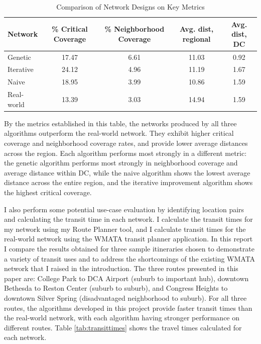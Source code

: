 \documentclass[sigconf,nonacm]{acmart}
\begin{document}
\begin{table}[h]
\caption{Comparison of Network Designs on Key Metrics}
\label{tab:networkmetrics}
\begin{tabular}{lcccc}
\toprule
\textbf{Network} & \textbf{\% Critical Coverage} & \textbf{\% Neighborhood Coverage} & \textbf{Avg. dist, regional} & \textbf{Avg. dist, DC} \\
\midrule
Genetic & 17.47 & 6.61 & 11.03 & 0.92 \\
Iterative & 24.12 & 4.96 & 11.19 & 1.67 \\
Naive & 18.95 & 3.99 & 10.86 & 1.59 \\
\midrule
Real-world & 13.39 & 3.03 & 14.94 & 1.59 \\
\bottomrule
\end{tabular}
\end{table}

By the metrics established in this table, the networks produced by all three algorithms outperform the real-world network. They exhibit higher critical coverage and neighborhood coverage rates, and provide lower average distances across the region. Each algorithm performs most strongly in a different metric: the genetic algorithm performs most strongly in neighborhood coverage and average distance within DC, while the naive algorithm shows the lowest average distance across the entire region, and the iterative improvement algorithm shows the highest critical coverage. 

I also perform some potential use-case evaluation by identifying location pairs and calculating the transit time in each network. I calculate the transit times for my network using my Route Planner tool, and I calculate transit times for the real-world network using the WMATA transit planner application. In this report I compare the results obtained for three sample itineraries chosen to demonstrate a variety of transit uses and to address the shortcomings of the existing WMATA network that I raised in the introduction. The three routes presented in this paper are: College Park to DCA Airport (suburb to important hub), downtown Bethesda to Reston Center (suburb to suburb), and Congress Heights to downtown Silver Spring (disadvantaged neighborhood to suburb). For all three routes, the algorithms developed in this project provide faster transit times than the real-world network, with each algorithm having stronger performance on different routes. Table \ref{tab:transittimes} shows the travel times calculated for each network. 
\end{document}
